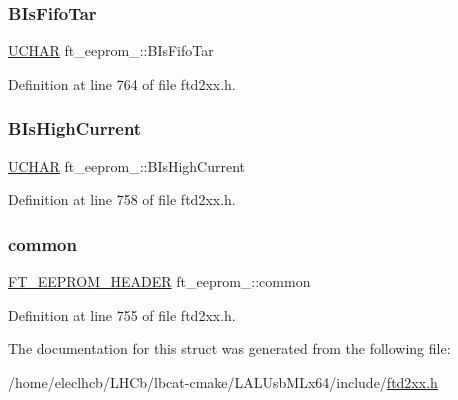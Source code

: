 \subsubsection{\texorpdfstring{B\+Is\+Fifo\+Tar}{BIsFifoTar}}
{\footnotesize\ttfamily \hyperlink{CatCaloProto40MHz_2inc_2WinTypes_8h_a4f4bb67531a9bf6f0b9c6ad76aeba587}{U\+C\+H\+AR} ft\+\_\+eeprom\+\_\+::\+B\+Is\+Fifo\+Tar}



Definition at line 764 of file ftd2xx.\+h.

\mbox{\label{structft__eeprom__2232_a2d7b4af1ab0e3b0084e13b83f513b5d5}} 
\subsubsection{\texorpdfstring{B\+Is\+High\+Current}{BIsHighCurrent}}
{\footnotesize\ttfamily \hyperlink{CatCaloProto40MHz_2inc_2WinTypes_8h_a4f4bb67531a9bf6f0b9c6ad76aeba587}{U\+C\+H\+AR} ft\+\_\+eeprom\+\_\+::\+B\+Is\+High\+Current}



Definition at line 758 of file ftd2xx.\+h.

\mbox{\label{structft__eeprom__2232_a6b294dc09899eb022f2e949b3d5c4972}} 
\subsubsection{\texorpdfstring{common}{common}}
{\footnotesize\ttfamily \hyperlink{LALUsbMLx64_2include_2ftd2xx_8h_ad5a6f519cd67a403fd8742756462394e}{F\+T\+\_\+\+E\+E\+P\+R\+O\+M\+\_\+\+H\+E\+A\+D\+ER} ft\+\_\+eeprom\+\_\+::common}



Definition at line 755 of file ftd2xx.\+h.



The documentation for this struct was generated from the following file\+:\begin{DoxyCompactItemize}
\item 
/home/eleclhcb/\+L\+H\+Cb/lbcat-\/cmake/\+L\+A\+L\+Usb\+M\+Lx64/include/\hyperlink{LALUsbMLx64_2include_2ftd2xx_8h}{ftd2xx.\+h}\end{DoxyCompactItemize}
